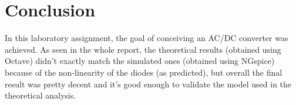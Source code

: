 \section{Conclusion}
\label{sec:conclusion}

\par In this laboratory assignment, the goal of conceiving an AC/DC converter was achieved. As seen in the whole report, the theoretical results (obtained using Octave) didn't exactly match the simulated ones (obtained using NGspice) because of the non-linearity of the diodes (as predicted), but overall the final result was pretty decent and it's good enough to validate the model used in the theoretical analysis.



